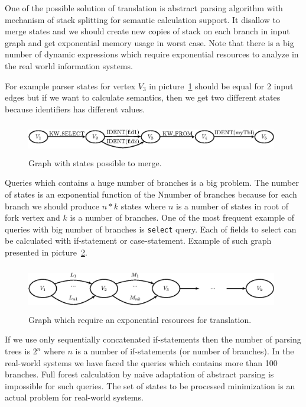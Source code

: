 \documentclass{llncs}
\begin{document}
One of the possible solution of translation is abstract parsing algorithm with mechanism of stack splitting for semantic calculation support. It disallow to merge states and we should create new copies of stack on each branch in input graph and get exponential memory usage in worst case. Note that there is a big number of dynamic expressions which require exponential resources to analyze in the real world information systems. 

For example parser states for vertex $V_3$ in picture~\ref{pic4} should be equal for 2 input edges but if we want to calculate semantics, then we get two different states because identifiers has different values.

\begin{figure}
    \begin{center}
        \includegraphics[width=11cm,height=1.4cm]{graphs/states_example.eps}
        \caption{Graph with states possible to merge.}
        \label{pic4}
    \end{center}
\end{figure}

Queries which contains a huge number of branches is a big problem. The number of states is an exponential function of the Nnumber of branches because for each branch we should produce $n*k$ states where $n$ is a number of states in root of fork vertex and $k$ is a number of branches. One of the most frequent example of queries with big number of branches is \verb|select| query. Each of fields to select can be calculated with if-statement or case-statement. Example of such graph presented in picture~\ref{pic5}.

\begin{figure}
    \begin{center}
        \includegraphics[width=11cm,height=2cm]{graphs/big_res.eps}
        \caption{Graph which require an exponential resources for translation.}
        \label{pic5}
    \end{center}
\end{figure}

If we use only sequentially concatenated if-statements then the number of parsing trees is $2^n$ where $n$ is a number of if-statements (or number of branches). In the real-world systems we have faced the queries which contains more than 100 branches. Full forest calculation by naive adaptation of abstract parsing is impossible for such queries. The set of states to be processed minimization is an actual problem for real-world systems.
\end{document}
